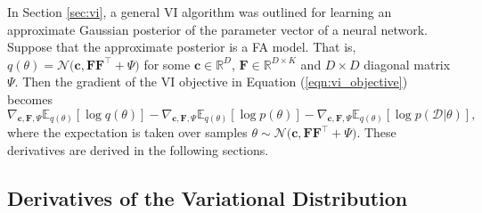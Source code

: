 \documentclass[msc,deptreport.inf]{infthesis} %
\newcommand{\matr}[1]{\mathbf{#1}}
\newcommand{\R}{\mathbb R}
\newcommand{\E}{\mathbb E}
\begin{document}
In Section \ref{sec:vi}, a general VI algorithm was outlined for learning an approximate Gaussian posterior of the parameter vector of a neural network. Suppose that the approximate posterior is a FA model. That is, $q(\theta) = \mathcal{N}\big(\matr{c}, \matr{FF}^{\intercal} + \Psi\big)$ for some $\matr{c} \in \R^D$, $\matr{F} \in \R^{D \times K}$ and $D \times D$ diagonal matrix $\Psi$. Then the gradient of the VI objective in Equation (\ref{eqn:vi_objective}) becomes 
\begin{equation}\label{eqn:vi_fa_derivatives}
	\nabla_{\matr{c}, \matr{F}, \Psi} \E_{q(\theta)} [\log q(\theta)]
	- \nabla_{\matr{c}, \matr{F}, \Psi} \E_{q(\theta)} [\log p(\theta)]
	-  \nabla_{\matr{c}, \matr{F}, \Psi} \E_{q(\theta)} [\log p(\mathcal{D} | \theta)],
\end{equation}
where the expectation is taken over samples $\theta \sim \mathcal{N}\big(\matr{c}, \matr{FF}^{\intercal} + \Psi\big)$. These derivatives are derived in the following sections. 


\subsection{Derivatives of the Variational Distribution}
\end{document}

